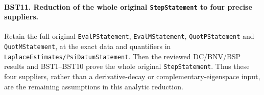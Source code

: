 \documentclass[11pt,a4paper]{article}
\numberwithin{equation}{section}
\theoremstyle{remark}\newtheorem{remark}[theorem]{Remark}
\begin{document}
\paragraph{BST11. Reduction of the whole original \texttt{Step\allowbreak Statement} to four precise suppliers.}
\label{claim:BST11}
Retain the full original \texttt{Eval\allowbreak PStatement},
\texttt{Eval\allowbreak MStatement}, \texttt{Quot\allowbreak PStatement} and
\texttt{Quot\allowbreak MStatement}, at the exact data and quantifiers in
\texttt{Laplace\allowbreak Estimates/\allowbreak Psi\allowbreak Datum\allowbreak Statement}.  Then the reviewed
DC/BNV/BSP results and BST1--BST10 prove the whole original
\texttt{Step\allowbreak Statement}.
Thus these four suppliers, rather than a derivative-decay or
complementary-eigenspace input, are the remaining assumptions in
this analytic reduction.
\end{document}
